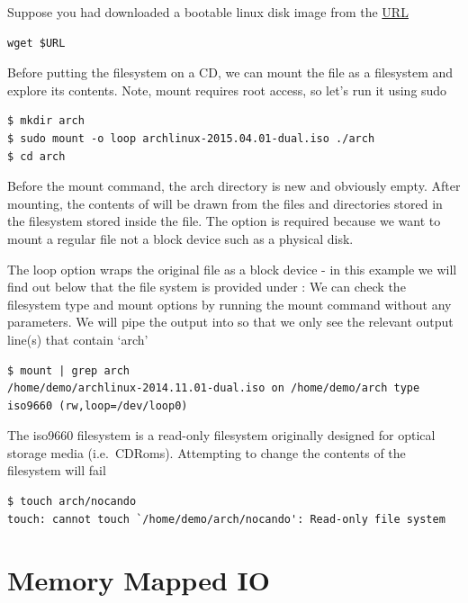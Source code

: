 Suppose you had downloaded a bootable linux disk image from the \href{http://cosmos.cites.illinois.edu/pub/archlinux/iso/2015.04.01/archlinux-2015.04.01-dual.iso}{URL}

\begin{lstlisting}
wget $URL
\end{lstlisting}

Before putting the filesystem on a CD, we can mount the file as a filesystem and explore its contents. Note, mount requires root access, so let's run it using sudo

\begin{lstlisting}
$ mkdir arch
$ sudo mount -o loop archlinux-2015.04.01-dual.iso ./arch
$ cd arch
\end{lstlisting}

Before the mount command, the arch directory is new and obviously empty. After mounting, the contents of  will be drawn from the files and directories stored in the filesystem stored inside the  file. The  option is required because we want to mount a regular file not a block device such as a physical disk.

The loop option wraps the original file as a block device - in this example we will find out below that the file system is provided under  : We can check the filesystem type and mount options by running the mount command without any parameters. We will pipe the output into  so that we only see the relevant output line(s) that contain `arch'

\begin{lstlisting}
$ mount | grep arch
/home/demo/archlinux-2014.11.01-dual.iso on /home/demo/arch type iso9660 (rw,loop=/dev/loop0)
\end{lstlisting}

The iso9660 filesystem is a read-only filesystem originally designed for optical storage media (i.e.~CDRoms). Attempting to change the contents of the filesystem will fail

\begin{lstlisting}
$ touch arch/nocando
touch: cannot touch `/home/demo/arch/nocando': Read-only file system
\end{lstlisting}

\section{Memory Mapped IO}


